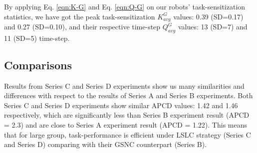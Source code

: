 \documentclass{intech}
\begin{document}
By applying Eq. \ref{eqn:K-G} and Eq. \ref{eqn:Q-G} on our robots' task-sensitization statistics, we have got the peak task-sensitization $K^G_{avg}$ values: 0.39 (SD=0.17) and 0.27 (SD=0.10), and their respective time-step $Q^G_{avg}$ values: 13 (SD=7) and 11 (SD=5) time-step.
\subsection{Comparisons}
Results from Series C and Series D experiments show us many similarities and differences with respect to the results of Series A and Series B experiments. Both Series C and Series D experiments show similar APCD values: 1.42 and 1.46 respectively, which are significantly less than Series B experiment result (APCD = 2.3) and are close to Series A experiment result (APCD = 1.22). This means that for large group, task-performance  is efficient under LSLC strategy (Series C and Series D) comparing with their GSNC counterpart (Series B).
\end{document}
